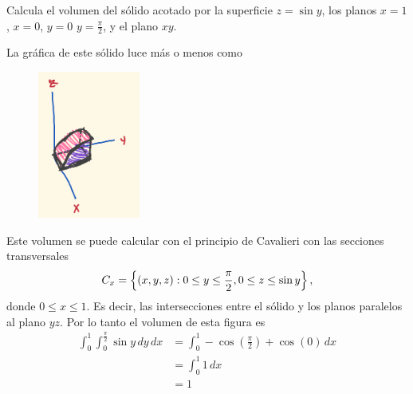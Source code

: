 Calcula el volumen del sólido acotado por la superficie \( z=\sin y \), los
planos \( x=1 \), \( x=0 \), \( y=0 \) \( y= \frac{\pi}{2} \), y el plano \( xy \).
\begin{solution}
    La gráfica de este sólido luce más o menos como
    \begin{figure}[H]
        \begin{center}
            \includegraphics[width=0.3\textwidth]{img/Ej3/ej10.png}
        \end{center}
    \end{figure}
    Este volumen se puede calcular con el principio de Cavalieri con las secciones transversales
    \[
        C_x=\left\{ (x,y,z):0 \leq y\leq \frac{\pi}{2},0\leq z\leq \sin y \right\},
    \]
    donde $0\leq x\leq 1$. Es decir, las intersecciones entre el sólido y los planos paralelos al 
    plano \( yz \).
    Por lo tanto el volumen de esta figura es 
    \begin{align*}
        \int_0^1
        \int_0^{\frac{\pi}{2}}
        \sin y
        \,dy
        \,dx
        &=
        \int_0^1
        -\cos \left( \frac{\pi}{2} \right)+
        \cos(0)
        \,dx\\
        &=
        \int_0^1 1 \, dx
        \\
        &=
        1
    \end{align*}
\end{solution}
